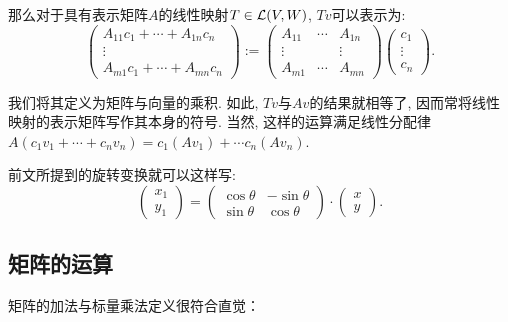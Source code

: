 那么对于具有表示矩阵$A$的线性映射$T \in \mathcal{L} (V,W)$, $Tv$可以表示为: 
$$\begin{pmatrix}
		A_{11}c_1+\cdots +A_{1n}c_n \\ \vdots \\ A_{m1}c_1+\cdots +A_{mn}c_n
	\end{pmatrix} := \begin{pmatrix}
		A_{11} & \cdots & A_{1n} \\
		\vdots &  & \vdots \\
		A_{m1} & \cdots & A_{mn}
	\end{pmatrix} \begin{pmatrix}
		c_1 \\ \vdots \\ c_n
	\end{pmatrix}.$$
	
我们将其定义为矩阵与向量的乘积. 如此, $Tv$与$Av$的结果就相等了, 因而常将线性映射的表示矩阵写作其本身的符号. 当然, 这样的运算满足线性分配律$A(c_1v_1 + \cdots + c_nv_n) = c_1(Av_1) + \cdots c_n(Av_n)$. 

前文所提到的旋转变换就可以这样写: $$\begin{pmatrix}
		x_1 \\ y_1
	\end{pmatrix} = \begin{pmatrix}
		\cos \theta & -\sin \theta \\ \sin \theta & \cos \theta
	\end{pmatrix} \cdot \begin{pmatrix}
		x \\ y
	\end{pmatrix}.$$



\subsection{矩阵的运算}

矩阵的加法与标量乘法定义很符合直觉：

